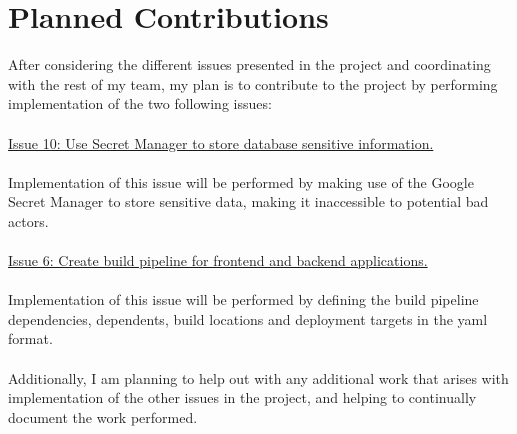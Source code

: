 \section{Planned Contributions}
After considering the different issues presented in the project and coordinating with the rest of my team, my plan is to contribute to the project by performing implementation of the two following issues:\\\\
\href{https://gitlab.sdu.dk/jolee18/cloud-bite-terraform-g-10/-/issues/10}{Issue 10: Use Secret Manager to store database sensitive information.}\\\\
Implementation of this issue will be performed by making use of the Google Secret Manager to store sensitive data, making it inaccessible to potential bad actors.
\\
\\
\href{https://gitlab.sdu.dk/jolee18/cloud-bite-terraform-g-10/-/issues/6}{Issue 6: Create build pipeline for frontend and backend applications.}
\\\\
Implementation of this issue will be performed by defining the build pipeline dependencies, dependents, build locations and deployment targets in the yaml format.
\\\\
Additionally, I am planning to help out with any additional work that arises with implementation of the other issues in the project, and helping to continually document the work performed.
